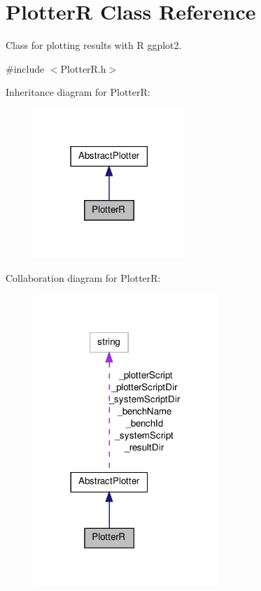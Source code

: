 \hypertarget{classPlotterR}{\section{Plotter\-R Class Reference}
\label{classPlotterR}
}


Class for plotting results with R ggplot2.  




{\ttfamily \#include $<$Plotter\-R.\-h$>$}



Inheritance diagram for Plotter\-R\-:\nopagebreak
\begin{figure}[H]
\begin{center}
\leavevmode
\includegraphics[width=162pt]{classPlotterR__inherit__graph}
\end{center}
\end{figure}


Collaboration diagram for Plotter\-R\-:\nopagebreak
\begin{figure}[H]
\begin{center}
\leavevmode
\includegraphics[width=197pt]{classPlotterR__coll__graph}
\end{center}
\end{figure}
